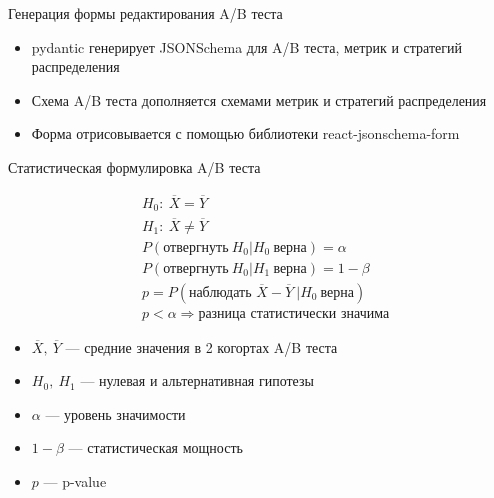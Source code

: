 \documentclass[12pt, unicode]{beamer}
\begin{document}
	\begin{frame}[fragile]{Генерация формы редактирования A/B теста}
		\begin{block}{}
			\begin{itemize}
				\item pydantic генерирует JSONSchema для A/B теста, метрик и стратегий распределения
				\item Схема A/B теста дополняется схемами метрик и стратегий распределения
				\item Форма отрисовывается с помощью библиотеки react-jsonschema-form
			\end{itemize}
		\end{block}
	\end{frame}
	

	\begin{frame}[fragile]{Статистическая формулировка A/B теста}
		\begin{block}{}
			\vspace*{-0.8cm}
			\begin{equation*}
				\begin{aligned}
					&H_0:\ \overline{X}=\overline{Y}\\
					&H_1:\ \overline{X}\ne\overline{Y}\\
					&P(\text{отвергнуть}\ H_0|H_0\ \text{верна})=\alpha\\
					&P(\text{отвергнуть}\ H_0|H_1\ \text{верна})=1-\beta\\
					&p = P(\text{наблюдать }\overline{X}-\overline{Y}\ |H_0\ \text{верна})\\
					&p<\alpha\Rightarrow\text{разница статистически значима}
				\end{aligned}
			\end{equation*}
			\vspace*{-0.5cm}
			\begin{itemize}
				\item $\overline{X},\ \overline{Y}$ --- средние значения в 2 когортах A/B теста
				\item $H_0,\ H_1$ --- нулевая и альтернативная гипотезы
				\item $\alpha$ --- уровень значимости
				\item $1-\beta$ --- статистическая мощность
				\item $p$ --- p-value
			\end{itemize}
		\end{block}
	\end{frame}
	
\end{document}
